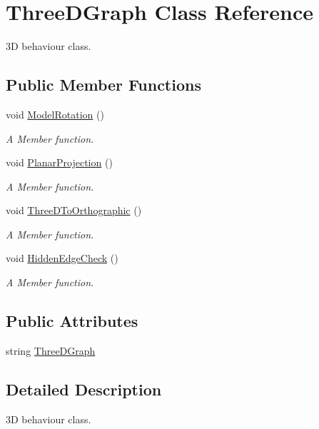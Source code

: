 \hypertarget{classThreeDGraph}{}\section{Three\+D\+Graph Class Reference}
\label{classThreeDGraph}


3D behaviour class.  


\subsection*{Public Member Functions}
\begin{DoxyCompactItemize}
\item 
void \hyperlink{classThreeDGraph_abc739a0c4de5c007b113558992d96968}{Model\+Rotation} ()
\begin{DoxyCompactList}\small\item\em A Member function. \end{DoxyCompactList}\item 
void \hyperlink{classThreeDGraph_a89922d3d78cdc0152dfd2974e66e7d5d}{Planar\+Projection} ()
\begin{DoxyCompactList}\small\item\em A Member function. \end{DoxyCompactList}\item 
void \hyperlink{classThreeDGraph_a7f484956c7d616b6724e758ed43e5bed}{Three\+D\+To\+Orthographic} ()
\begin{DoxyCompactList}\small\item\em A Member function. \end{DoxyCompactList}\item 
void \hyperlink{classThreeDGraph_a33b4bb0d5a42dba80e987b3d709347a0}{Hidden\+Edge\+Check} ()
\begin{DoxyCompactList}\small\item\em A Member function. \end{DoxyCompactList}\end{DoxyCompactItemize}
\subsection*{Public Attributes}
\begin{DoxyCompactItemize}
\item 
string \hyperlink{classThreeDGraph_ab2553252d92e1a3e81e58b81ef95220a}{Three\+D\+Graph}
\end{DoxyCompactItemize}


\subsection{Detailed Description}
3D behaviour class. 

